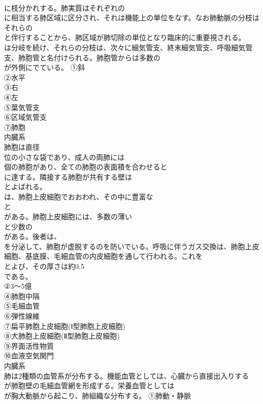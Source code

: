\documentclass[8pt]{extreport}
\begin{document}
\begin{CJK}{UTF8}{min}
\\	に枝分かれする。肺実質はそれぞれの
\\	に相当する肺区域に区分され、それは機能上の単位をなす。なお肺動脈の分枝はそれらの
\\	と伴行することから、肺区域が肺切除の単位となり臨床的に重要視される。
\\	は分岐を続け、それらの分枝は、次々に細気管支、終末細気管支、呼吸細気管支、肺胞管と名付けられる。肺胞管からは多数の
\\	が外側にでている。	①斜
\\	②水平
\\	③右
\\	④左
\\	⑤葉気管支
\\	⑥区域気管支
\\	⑦肺胞
\\	内臓系
\\	肺胞は直径
\\	位の小さな袋であり、成人の両肺には
\\	個の肺胞があり、全ての肺胞の表面積を合わせると
\\	に達する。隣接する肺胞が共有する壁は
\\	とよばれる。
\\	は、肺胞上皮細胞でおおわれ、その中に豊富な
\\	と
\\	がある。肺胞上皮細胞には、多数の薄い
\\	と少数の
\\	がある。後者は、
\\	を分泌して、肺胞が虚脱するのを防いでいる。呼吸に伴うガス交換は、肺胞上皮細胞、基底膜、毛細血管の内皮細胞を通して行われる。これを
\\	とよび、その厚さは約0.5
\\	である。	
\\	②3～5億
\\	④肺胞中隔
\\	⑤毛細血管
\\	⑥弾性線維
\\	⑦扁平肺胞上皮細胞(Ⅰ型肺胞上皮細胞)
\\	⑧大肺胞上皮細胞(Ⅱ型肺胞上皮細胞)
\\	⑨界面活性物質
\\	⑩血液空気関門
\\	内臓系
\\	肺は2種類の血管系が分布する。機能血管としては、心臓から直接出入りする
\\	が肺胞壁の毛細血管網を形成する。栄養血管としては
\\	が胸大動脈から起こり、肺組織な分布する。	①肺動・静脈

\end{CJK}
\end{document}
